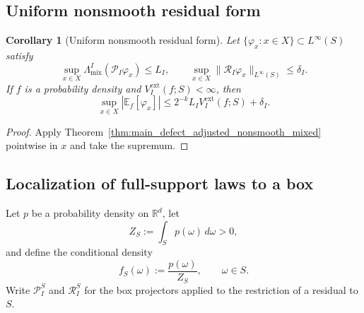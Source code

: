 \documentclass[11pt,letterpaper]{article}
\newtheorem{corollary}[theorem]{Corollary}
\theoremstyle{definition}
\theoremstyle{remark}
\begin{document}
  
\subsection{Uniform nonsmooth residual form}
\label{subsec:appendix_uniform_nonsmooth_residual}
  

\begin{corollary}[Uniform nonsmooth residual form]
\label{cor:appendix_uniform_residual_nonsmooth}
Let $\{\varphi_x:x\in X\}\subset L^\infty(S)$ satisfy
$$
\sup_{x\in X}\Lambda_{\mathrm{mix}}^I(\mathcal P_I\varphi_x)
\le L_I,
\qquad
\sup_{x\in X}\|\mathcal R_I\varphi_x\|_{L^\infty(S)}
\le \delta_I.
$$
If $f$ is a probability density and
$V_I^{\mathrm{ext}}(f;S)<\infty$, then
\begin{equation}
\label{eq:appendix_uniform_residual_nonsmooth}
\sup_{x\in X}|\mathbb E_f[\varphi_x]|
\le
2^{-k}L_IV_I^{\mathrm{ext}}(f;S)+\delta_I.
\end{equation}
\end{corollary}

\begin{proof}
Apply Theorem~\ref{thm:main_defect_adjusted_nonsmooth_mixed} pointwise in
$x$ and take the supremum.
\end{proof}

  
\subsection{Localization of full-support laws to a box}
\label{subsec:appendix_full_support_localization}
  

Let $p$ be a probability density on $\mathbb R^d$, let
$$
Z_S:=\int_Sp(\omega)\,d\omega>0,
$$
and define the conditional density
$$
f_S(\omega):=\frac{p(\omega)}{Z_S},
\qquad
\omega\in S.
$$
Write $\mathcal P_I^S$ and $\mathcal R_I^S$ for the box projectors applied to
the restriction of a residual to $S$.
\end{document}
